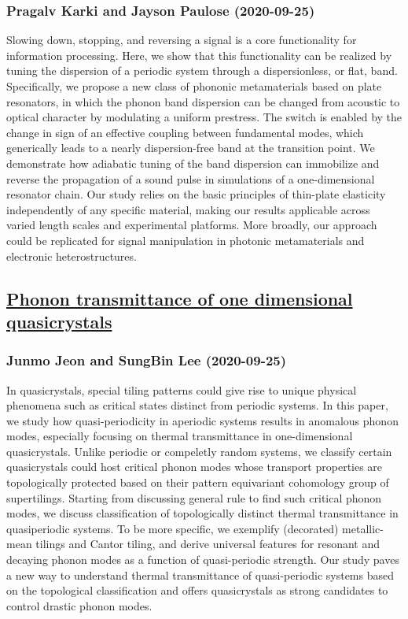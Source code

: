 \subsubsection*{Pragalv Karki and Jayson Paulose (2020-09-25)}
Slowing down, stopping, and reversing a signal is a core functionality for
information processing. Here, we show that this functionality can be realized
by tuning the dispersion of a periodic system through a dispersionless, or
flat, band. Specifically, we propose a new class of phononic metamaterials
based on plate resonators, in which the phonon band dispersion can be changed
from acoustic to optical character by modulating a uniform prestress. The
switch is enabled by the change in sign of an effective coupling between
fundamental modes, which generically leads to a nearly dispersion-free band at
the transition point. We demonstrate how adiabatic tuning of the band
dispersion can immobilize and reverse the propagation of a sound pulse in
simulations of a one-dimensional resonator chain. Our study relies on the basic
principles of thin-plate elasticity independently of any specific material,
making our results applicable across varied length scales and experimental
platforms. More broadly, our approach could be replicated for signal
manipulation in photonic metamaterials and electronic heterostructures.

\subsection*{\href{http://arxiv.org/abs/2009.12378v1}{Phonon transmittance of one dimensional quasicrystals}}
\subsubsection*{Junmo Jeon and SungBin Lee (2020-09-25)}
In quasicrystals, special tiling patterns could give rise to unique physical
phenomena such as critical states distinct from periodic systems. In this
paper, we study how quasi-periodicity in aperiodic systems results in anomalous
phonon modes, especially focusing on thermal transmittance in one-dimensional
quasicrystals. Unlike periodic or compeletly random systems, we classify
certain quasicrystals could host critical phonon modes whose transport
properties are topologically protected based on their pattern equivariant
cohomology group of supertilings. Starting from discussing general rule to find
such critical phonon modes, we discuss classification of topologically distinct
thermal transmittance in quasiperiodic systems. To be more specific, we
exemplify (decorated) metallic-mean tilings and Cantor tiling, and derive
universal features for resonant and decaying phonon modes as a function of
quasi-periodic strength. Our study paves a new way to understand thermal
transmittance of quasi-periodic systems based on the topological classification
and offers quasicrystals as strong candidates to control drastic phonon modes.

